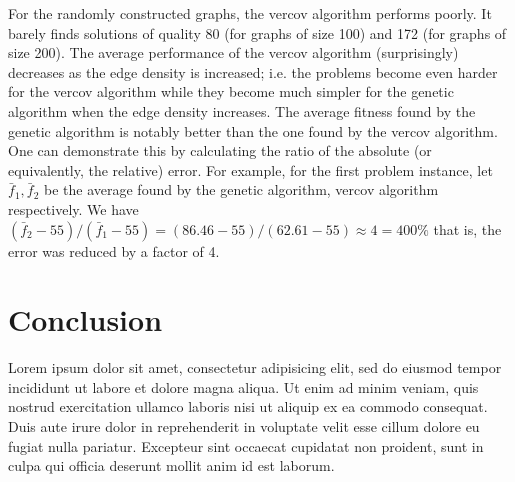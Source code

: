 \documentclass[12pt]{article}
\begin{document}
For the randomly constructed graphs, the vercov algorithm
performs poorly.
It barely finds solutions of quality 80 (for graphs of size 100)
and 172 (for graphs of size 200).
The average performance of the vercov algorithm (surprisingly)
decreases as the edge density is increased;
i.e. the problems become even harder for the vercov algorithm
while they become much simpler for the genetic algorithm when
the edge density increases.
The average fitness found by the genetic algorithm is notably
better than the one found by the vercov algorithm.
One can demonstrate this by calculating
the ratio of the absolute (or equivalently, the relative) error.
For example, for the first problem instance,
let $\bar{f}_1, \bar{f}_2$ be the average found by
the genetic algorithm, vercov algorithm respectively.
We have $ (\bar{f}_2 - 55) / (\bar{f}_1 - 55) = (86.46 - 55)/(62.61 - 55) \approx 4 = 400\%$
that is, the error was reduced by a factor of 4.


\section{Conclusion}
Lorem ipsum dolor sit amet, consectetur adipisicing elit, sed do eiusmod
tempor incididunt ut labore et dolore magna aliqua. Ut enim ad minim veniam,
quis nostrud exercitation ullamco laboris nisi ut aliquip ex ea commodo
consequat. Duis aute irure dolor in reprehenderit in voluptate velit esse
cillum dolore eu fugiat nulla pariatur. Excepteur sint occaecat cupidatat non
proident, sunt in culpa qui officia deserunt mollit anim id est laborum.
\cite[hi][go]{coley} \cite{davis}


\pagebreak


\cleardoublepage{}
%
%
\printbibliography

\end{document}
